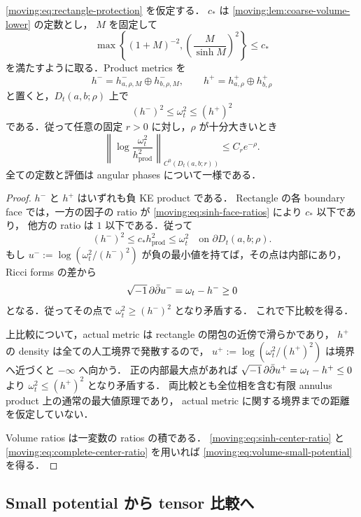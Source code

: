 \begin{proposition}
\label{coarse:lem:annular-volume-squeeze}
\eqref{moving:eq:rectangle-protection} を仮定する．
$c_*$ は \cref{moving:lem:coarse-volume-lower} の定数とし，
$M$ を固定して
\[
 \max\left\{(1+M)^{-2},
       \left(\frac{M}{\sinh M}\right)^2\right\}\le c_*
\]
を満たすように取る．Product metrics を
\[
 h^- = h^-_{a,\rho,M}\oplus h^-_{b,\rho,M},\qquad
 h^+ = h^+_{a,\rho}\oplus h^+_{b,\rho}
\]
と置くと，$D_t(a,b;\rho)$ 上で
\begin{equation}\label{moving:eq:volume-sandwich}
 (h^-)^2\le\omega_t^2\le(h^+)^2
\end{equation}
である．従って任意の固定 $r>0$ に対し，$\rho$ が十分大きいとき
\begin{equation}\label{moving:eq:volume-small-potential}
 \left\|\log\frac{\omega_t^2}{h_{\mathrm{prod}}^2}
 \right\|_{C^0(D_t(a,b;r))}
 \le C_r e^{-\rho}.
\end{equation}
全ての定数と評価は angular phases について一様である．
\end{proposition}

\begin{proof}
$h^-$ と $h^+$ はいずれも負 KE product である．
Rectangle の各 boundary face では，一方の因子の ratio が
\eqref{moving:eq:sinh-face-ratios} により $c_*$ 以下であり，
他方の ratio は $1$ 以下である．従って
\[
 (h^-)^2\le c_*h_{\mathrm{prod}}^2\le\omega_t^2
 \quad\text{on }\partial D_t(a,b;\rho).
\]
もし $u^-:=\log(\omega_t^2/(h^-)^2)$ が負の最小値を持てば，その点は内部にあり，
Ricci forms の差から
\[
 \sqrt{-1}\,\partial\bar\partial u^- =\omega_t-h^-\ge0
\]
となる．従ってその点で $\omega_t^2\ge(h^-)^2$ となり矛盾する．
これで下比較を得る．

上比較について，actual metric は rectangle の閉包の近傍で滑らかであり，
$h^+$ の density は全ての人工境界で発散するので，
$u^+:=\log(\omega_t^2/(h^+)^2)$ は境界へ近づくと $-\infty$ へ向かう．
正の内部最大点があれば
$\sqrt{-1}\,\partial\bar\partial u^+=\omega_t-h^+\le0$ より
$\omega_t^2\le(h^+)^2$ となり矛盾する．
両比較とも全位相を含む有限 annulus product 上の通常の最大値原理であり，
actual metric に関する境界までの距離を仮定していない．

Volume ratios は一変数の ratios の積である．
\eqref{moving:eq:sinh-center-ratio} と
\eqref{moving:eq:complete-center-ratio} を用いれば
\eqref{moving:eq:volume-small-potential} を得る．
\end{proof}

\subsection{Small potential から tensor 比較へ}

